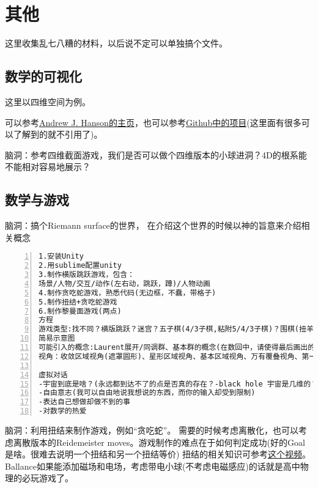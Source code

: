 \documentclass[11pt]{amsart}
\begin{document}
\section{其他}
这里收集乱七八糟的材料，以后说不定可以单独搞个文件。
\subsection{数学的可视化}
这里以四维空间为例。

可以参考\href{https://legacy.cs.indiana.edu/~hansona/}{Andrew J. Hanson的主页}，也可以参考\href{https://github.com/wxyhly/4dViewer}{Github中的项目}(这里面有很多可以了解到的就不引用了)。

脑洞：参考四维截面游戏，我们是否可以做个四维版本的小球进洞？4D的根系能不能相对容易地展示？

\subsection{数学与游戏}


脑洞：搞个Riemann surface的世界， 在介绍这个世界的时候以神的旨意来介绍相关概念
\begin{lstlisting}[numbers=left,numberstyle=\tiny,numbersep=10pt]
1.安装Unity
2.用sublime配置unity
3.制作横版跳跃游戏，包含：
场景/人物/交互/动作(左右动，跳跃，蹲)/人物动画
4.制作贪吃蛇游戏，熟悉代码(无边框，不蠢，带格子)
5.制作扭结+贪吃蛇游戏
6.制作黎曼面游戏(两点)
方程
游戏类型:找不同？横版跳跃？迷宫？五子棋(4/3子棋,粘附5/4/3子棋)？围棋(扭羊头游戏)?跳棋？空间爬行？扭结+贪吃蛇？塔防？数独？数回？华容道？ORBOX B?(这玩意可以做成三维版本!4维就有点难了)(mini metro？连连看？泡泡龙？消砖块？2048？推箱子？其他的Nikoli Puzzles？)
简易示意图
可能引入的概念:Laurent展开/同调群、基本群的概念(在数回中，请使得最后画出的曲线表示基本群不平凡但是同调群不平凡)/覆叠，万有覆叠，deck transformation(华容道简化难度:允许deck transformation将区块变换至另一个基本区域中相同的位置；或者，我们允许上下粘接)/曲率/曲率驱动游戏/descent(数独解何时能成为更小的黎曼面的解)
视角：收敛区域视角(遮罩圆形)、星形区域视角、基本区域视角、万有覆叠视角、第一人称视角、二维3D视角(视角需要通过"培训+考试"解锁)

虚拟对话
-宇宙到底是啥？(永远都到达不了的点是否真的存在？-black hole 宇宙是几维的？2+3(颜色)+1(时间) 如何测量时间，or时间的流逝是否是均匀的？)
-自由意志(我可以自由地说我想说的东西，而你的输入却受到限制)
-表达自己想做却做不到的事
-对数学的热爱

\end{lstlisting}

脑洞：利用扭结来制作游戏，例如“贪吃蛇”。 需要的时候考虑离散化，也可以考虑离散版本的Reidemeister moves。游戏制作的难点在于如何判定成功(好的Goal是啥。很难去说明一个扭结和另一个扭结等价)
扭结的相关知识可参考\href{https://www.youtube.com/watch?v=nYz3pRk1cCA}{这个视频}。Ballance如果能添加磁场和电场，考虑带电小球(不考虑电磁感应)的话就是高中物理的必玩游戏了。
\end{document}
